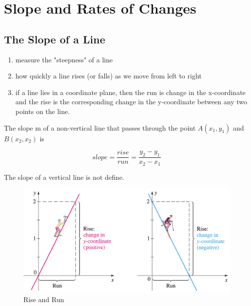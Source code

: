 \chapter{Slope and Rates of Changes}

\section{The Slope of a Line}

\begin{enumerate}
    \item measure the "steepness" of a line
    \item how quickly a line rises (or falls) as we move from left to right
    \item if a line lies in a coordinate plane, then the run is change in the x-coordinate and the rise is the corresponding change in the y-coordinate between any two points on the line.
\end{enumerate}

\begin{theorem}
The slope m of a non-vertical line that passes through the point $A(x_1, y_1)$ and $B(x_2, x_2)$ is 

\begin{equation}
\label{eq:1}
slope = \frac{rise}{run}=\frac{y_2 - y_1}{x_2 - x_1}
\end{equation}

\begin{flushleft}
The slope of a vertical line is not define.
\end{flushleft}

\end{theorem}

\begin{figure}[h]
    \centering
    \includegraphics[scale=0.3]{chapter001/figures/fig001}
    \caption{Rise and Run}
    \label{fig:Fig1}
\end{figure}

